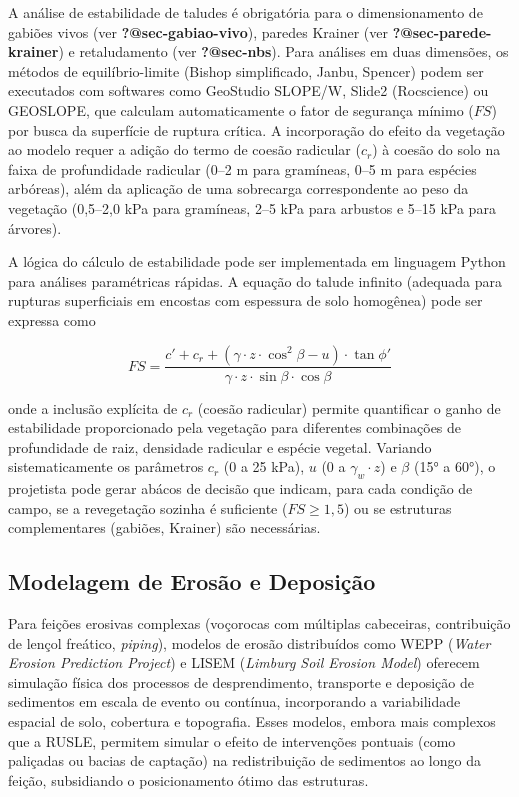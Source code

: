 \documentclass[
  portuguese,
  11pt,
  a4paper,
  open=any]{scrbook}
\begin{document}
A análise de estabilidade de taludes é obrigatória para o
dimensionamento de gabiões vivos (ver \textbf{?@sec-gabiao-vivo}),
paredes Krainer (ver \textbf{?@sec-parede-krainer}) e retaludamento (ver
\textbf{?@sec-nbs}). Para análises em duas dimensões, os métodos de
equilíbrio-limite (Bishop simplificado, Janbu, Spencer) podem ser
executados com softwares como GeoStudio SLOPE/W, Slide2 (Rocscience) ou
GEOSLOPE, que calculam automaticamente o fator de segurança mínimo
(\(FS\)) por busca da superfície de ruptura crítica. A incorporação do
efeito da vegetação ao modelo requer a adição do termo de coesão
radicular (\(c_r\)) à coesão do solo na faixa de profundidade radicular
(0--2 m para gramíneas, 0--5 m para espécies arbóreas), além da
aplicação de uma sobrecarga correspondente ao peso da vegetação
(0,5--2,0 kPa para gramíneas, 2--5 kPa para arbustos e 5--15 kPa para
árvores).

A lógica do cálculo de estabilidade pode ser implementada em linguagem
Python para análises paramétricas rápidas. A equação do talude infinito
(adequada para rupturas superficiais em encostas com espessura de solo
homogênea) pode ser expressa como

\[
FS = \frac{c' + c_r + (\gamma \cdot z \cdot \cos^2\beta - u) \cdot \tan\phi'}{\gamma \cdot z \cdot \sin\beta \cdot \cos\beta}
\]

onde a inclusão explícita de \(c_r\) (coesão radicular) permite
quantificar o ganho de estabilidade proporcionado pela vegetação para
diferentes combinações de profundidade de raiz, densidade radicular e
espécie vegetal. Variando sistematicamente os parâmetros \(c_r\) (0 a 25
kPa), \(u\) (0 a \(\gamma_w \cdot z\)) e \(\beta\) (15° a 60°), o
projetista pode gerar abácos de decisão que indicam, para cada condição
de campo, se a revegetação sozinha é suficiente (\(FS \geq 1{,}5\)) ou
se estruturas complementares (gabiões, Krainer) são necessárias.

\subsection{Modelagem de Erosão e
Deposição}\label{modelagem-de-erosuxe3o-e-deposiuxe7uxe3o}

Para feições erosivas complexas (voçorocas com múltiplas cabeceiras,
contribuição de lençol freático, \emph{piping}), modelos de erosão
distribuídos como WEPP (\emph{Water Erosion Prediction Project}) e LISEM
(\emph{Limburg Soil Erosion Model}) oferecem simulação física dos
processos de desprendimento, transporte e deposição de sedimentos em
escala de evento ou contínua, incorporando a variabilidade espacial de
solo, cobertura e topografia. Esses modelos, embora mais complexos que a
RUSLE, permitem simular o efeito de intervenções pontuais (como
paliçadas ou bacias de captação) na redistribuição de sedimentos ao
longo da feição, subsidiando o posicionamento ótimo das estruturas.
\end{document}
